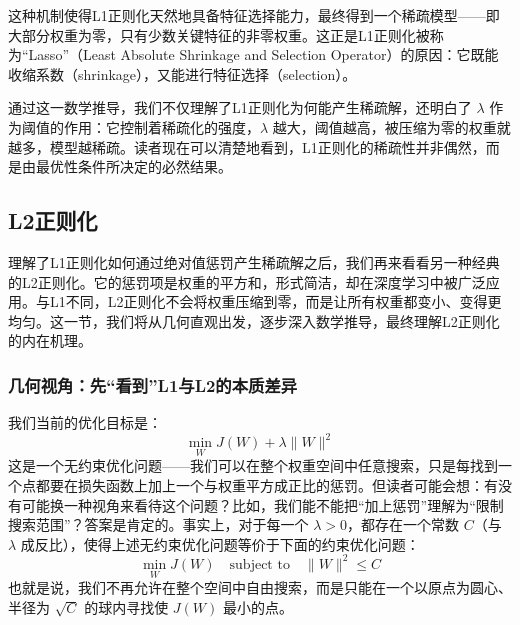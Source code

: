 \documentclass[lang=cn,zihao=-4,a4paper,fontset=windows]{beautybook}
\begin{document}
这种机制使得L1正则化天然地具备特征选择能力，最终得到一个稀疏模型——即大部分权重为零，只有少数关键特征的非零权重。这正是L1正则化被称为“Lasso”（Least Absolute Shrinkage and Selection Operator）的原因：它既能收缩系数（shrinkage），又能进行特征选择（selection）。

通过这一数学推导，我们不仅理解了L1正则化为何能产生稀疏解，还明白了 \(\lambda\) 作为阈值的作用：它控制着稀疏化的强度，\(\lambda\) 越大，阈值越高，被压缩为零的权重就越多，模型越稀疏。读者现在可以清楚地看到，L1正则化的稀疏性并非偶然，而是由最优性条件所决定的必然结果。

\subsection{L2正则化}

理解了L1正则化如何通过绝对值惩罚产生稀疏解之后，我们再来看看另一种经典的L2正则化。它的惩罚项是权重的平方和，形式简洁，却在深度学习中被广泛应用。与L1不同，L2正则化不会将权重压缩到零，而是让所有权重都变小、变得更均匀。这一节，我们将从几何直观出发，逐步深入数学推导，最终理解L2正则化的内在机理。

\subsubsection*{几何视角：先“看到”L1与L2的本质差异}

我们当前的优化目标是：
\[
\min_W J(W) + \lambda \|W\|^2
\]
这是一个无约束优化问题——我们可以在整个权重空间中任意搜索，只是每找到一个点都要在损失函数上加上一个与权重平方成正比的惩罚。但读者可能会想：有没有可能换一种视角来看待这个问题？比如，我们能不能把“加上惩罚”理解为“限制搜索范围”？答案是肯定的。事实上，对于每一个 \(\lambda > 0\)，都存在一个常数 \(C\)（与 \(\lambda\) 成反比），使得上述无约束优化问题等价于下面的约束优化问题：
\[
\min_W J(W) \quad \text{subject to} \quad \|W\|^2 \le C
\]
也就是说，我们不再允许在整个空间中自由搜索，而是只能在一个以原点为圆心、半径为 \(\sqrt{C}\) 的球内寻找使 \(J(W)\) 最小的点。
\end{document}
